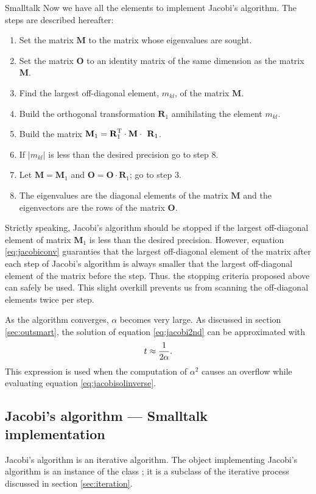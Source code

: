 \begin{displaycode}{Smalltalk}
 Now we have all the elements to
implement Jacobi's algorithm. The steps are described hereafter:
\begin{enumerate}
  \item Set the matrix $\textbf{M}$ to the matrix whose eigenvalues
  are sought.
  \item Set the matrix $\textbf{O}$ to an identity matrix of the same
  dimension as the matrix $\textbf{M}$.
  \item Find the largest off-diagonal element, $m_{kl}$, of the matrix $\textbf{
  M}$.
  \item Build the orthogonal transformation $\textbf{R}_1$
  annihilating the element $m_{kl}$.
  \item Build the matrix $\textbf{M}_1=\textbf{R}^{\mathop\textrm{T}}_1\cdot\textbf{M}\cdot\textbf{
  R}_1$.
  \item If $\left|m_{kl}\right|$ is less than the desired
  precision go to step 8.
  \item Let $\textbf{M}=\textbf{M}_1$ and $\textbf{O}=\textbf{O}\cdot\textbf{R}_1$; go to step 3.
  \item The eigenvalues are the diagonal elements of the matrix $\textbf{
  M}$ and the eigenvectors are the rows of the matrix $\textbf{O}$.
\end{enumerate}
Strictly speaking, Jacobi's algorithm should be stopped if the
largest off-diagonal element of matrix $\textbf{M}_1$ is less than
the desired precision. However, equation \ref{eq:jacobiconv}
guaranties that the largest off-diagonal element of the matrix
after each step of Jacobi's algorithm is always smaller that the
largest off-diagonal element of the matrix before the step. Thus.
the stopping criteria proposed above can safely be used. This
slight overkill prevents us from scanning the off-diagonal
elements twice per step.

As the algorithm converges, $\alpha$ becomes very large. As
discussed in section \ref{sec:outsmart}, the solution of equation
\ref{eq:jacobi2nd} can be approximated with
\begin{equation}
  t\approx{\displaystyle 1\over\displaystyle 2\alpha}.
\end{equation}
This expression is used when the computation of $\alpha^2$ causes
an overflow while evaluating equation \ref{eq:jacobisolinverse}.

\subsection{Jacobi's algorithm --- Smalltalk implementation}
Jacobi's algorithm is an iterative algorithm.
The object implementing Jacobi's algorithm is an instance of the class ; it is a subclass of the iterative process discussed in section \ref{sec:iteration}.


\end{displaycode}
